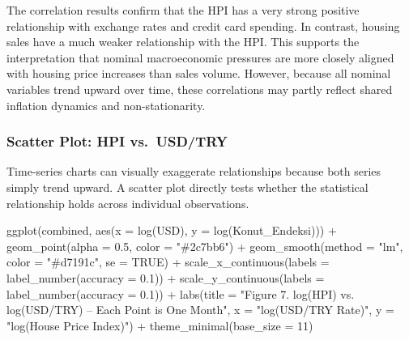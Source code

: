 \documentclass[
  11pt,
  a4paper,
]{article}
\newenvironment{Shaded}{\begin{snugshade}}{\end{snugshade}}
\newcommand{\AttributeTok}[1]{\textcolor[rgb]{0.40,0.45,0.13}{#1}}
\newcommand{\ConstantTok}[1]{\textcolor[rgb]{0.56,0.35,0.01}{#1}}
\newcommand{\DecValTok}[1]{\textcolor[rgb]{0.68,0.00,0.00}{#1}}
\newcommand{\FloatTok}[1]{\textcolor[rgb]{0.68,0.00,0.00}{#1}}
\newcommand{\FunctionTok}[1]{\textcolor[rgb]{0.28,0.35,0.67}{#1}}
\newcommand{\NormalTok}[1]{\textcolor[rgb]{0.00,0.23,0.31}{#1}}
\newcommand{\SpecialCharTok}[1]{\textcolor[rgb]{0.37,0.37,0.37}{#1}}
\newcommand{\StringTok}[1]{\textcolor[rgb]{0.13,0.47,0.30}{#1}}
\begin{document}
The correlation results confirm that the HPI has a very strong positive
relationship with exchange rates and credit card spending. In contrast,
housing sales have a much weaker relationship with the HPI. This
supports the interpretation that nominal macroeconomic pressures are
more closely aligned with housing price increases than sales volume.
However, because all nominal variables trend upward over time, these
correlations may partly reflect shared inflation dynamics and
non-stationarity.

\subsubsection{Scatter Plot: HPI
vs.~USD/TRY}\label{scatter-plot-hpi-vs.-usdtry}

Time-series charts can visually exaggerate relationships because both
series simply trend upward. A scatter plot directly tests whether the
statistical relationship holds across individual observations.

\begin{Shaded}
\begin{Highlighting}[]
\FunctionTok{ggplot}\NormalTok{(combined, }\FunctionTok{aes}\NormalTok{(}\AttributeTok{x =} \FunctionTok{log}\NormalTok{(USD), }\AttributeTok{y =} \FunctionTok{log}\NormalTok{(Konut\_Endeksi))) }\SpecialCharTok{+}
  \FunctionTok{geom\_point}\NormalTok{(}\AttributeTok{alpha =} \FloatTok{0.5}\NormalTok{, }\AttributeTok{color =} \StringTok{"\#2c7bb6"}\NormalTok{) }\SpecialCharTok{+}
  \FunctionTok{geom\_smooth}\NormalTok{(}\AttributeTok{method =} \StringTok{"lm"}\NormalTok{, }\AttributeTok{color =} \StringTok{"\#d7191c"}\NormalTok{, }\AttributeTok{se =} \ConstantTok{TRUE}\NormalTok{) }\SpecialCharTok{+}
  \FunctionTok{scale\_x\_continuous}\NormalTok{(}\AttributeTok{labels =} \FunctionTok{label\_number}\NormalTok{(}\AttributeTok{accuracy =} \FloatTok{0.1}\NormalTok{)) }\SpecialCharTok{+}
  \FunctionTok{scale\_y\_continuous}\NormalTok{(}\AttributeTok{labels =} \FunctionTok{label\_number}\NormalTok{(}\AttributeTok{accuracy =} \FloatTok{0.1}\NormalTok{)) }\SpecialCharTok{+}
  \FunctionTok{labs}\NormalTok{(}\AttributeTok{title =} \StringTok{"Figure 7. log(HPI) vs. log(USD/TRY) – Each Point is One Month"}\NormalTok{,}
       \AttributeTok{x =} \StringTok{"log(USD/TRY Rate)"}\NormalTok{, }\AttributeTok{y =} \StringTok{"log(House Price Index)"}\NormalTok{) }\SpecialCharTok{+}
  \FunctionTok{theme\_minimal}\NormalTok{(}\AttributeTok{base\_size =} \DecValTok{11}\NormalTok{)}
\end{Highlighting}
\end{Shaded}
\end{document}

